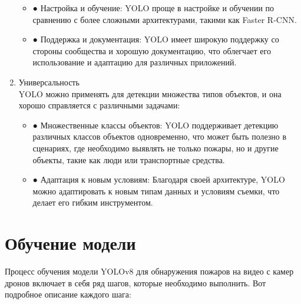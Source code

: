 \begin{enumerate}
\begin{itemize}
                \item ●	Настройка и обучение: YOLO проще в настройке и обучении по сравнению с более сложными архитектурами, такими как Faster R-CNN.
                \item ●	Поддержка и документация: YOLO имеет широкую поддержку со стороны сообщества и хорошую документацию, что облегчает его использование и адаптацию для различных приложений.
            \end{itemize}
        \item Универсальность \\
        YOLO можно применять для детекции множества типов объектов, и она хорошо справляется с различными задачами:
            \begin{itemize}
                \item ●	Множественные классы объектов: YOLO поддерживает детекцию различных классов объектов одновременно, что может быть полезно в сценариях, где необходимо выявлять не только пожары, но и другие объекты, такие как люди или транспортные средства.
                \item ●	Адаптация к новым условиям: Благодаря своей архитектуре, YOLO можно адаптировать к новым типам данных и условиям съемки, что делает его гибким инструментом.
            \end{itemize}
    \end{enumerate}

    \section{Обучение модели}
    Процесс обучения модели YOLOv8 для обнаружения пожаров на видео с камер дронов включает в себя ряд шагов, которые необходимо выполнить. Вот подробное описание каждого шага:


